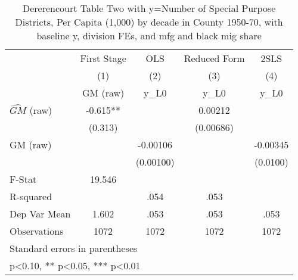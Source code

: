 \begin{table}[htbp]\centering
\def\sym#1{\ifmmode^{#1}\else\(^{#1}\)\fi}
\caption{Dererencourt Table Two with y=Number of Special Purpose Districts, Per Capita (1,000) by decade in County 1950-70, with baseline y, division FEs, and mfg and black mig share}
\begin{tabular}{l*{4}{c}}
\toprule
                    & First Stage   &         OLS   &Reduced Form   &        2SLS   \\
                    &\multicolumn{1}{c}{(1)}&\multicolumn{1}{c}{(2)}&\multicolumn{1}{c}{(3)}&\multicolumn{1}{c}{(4)}\\
                    &\multicolumn{1}{c}{GM  (raw)}&\multicolumn{1}{c}{y\_L0}&\multicolumn{1}{c}{y\_L0}&\multicolumn{1}{c}{y\_L0}\\
\midrule
$\hat{GM}$ (raw)    &      -0.615** &               &     0.00212   &               \\
                    &     (0.313)   &               &   (0.00686)   &               \\
\addlinespace
GM  (raw)           &               &    -0.00106   &               &    -0.00345   \\
                    &               &   (0.00100)   &               &    (0.0100)   \\
\midrule
F-Stat              &      19.546   &               &               &               \\
R-squared           &               &        .054   &        .053   &               \\
Dep Var Mean        &       1.602   &        .053   &        .053   &        .053   \\
Observations        &        1072   &        1072   &        1072   &        1072   \\
\bottomrule
\multicolumn{5}{l}{\footnotesize Standard errors in parentheses}\\
\multicolumn{5}{l}{\footnotesize * p<0.10, ** p<0.05, *** p<0.01}\\
\end{tabular}
\end{table}
